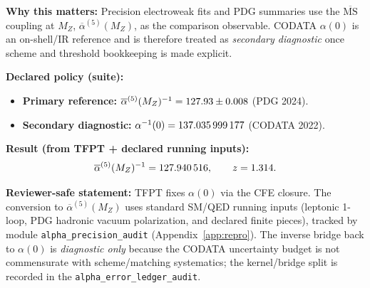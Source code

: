 \begin{tcolorbox}[colback=yellow!3, colframe=yellow!60!black,
    title={\textbf{Primary comparison observable: $\overline{\alpha}^{(5)}(M_Z)$ ($\overline{\mathrm{MS}}$)}}, fonttitle=\bfseries\small]
\textbf{Why this matters:} Precision electroweak fits and PDG summaries use the $\overline{\mathrm{MS}}$ coupling at $M_Z$, $\overline{\alpha}^{(5)}(M_Z)$, as the comparison observable. CODATA $\alpha(0)$ is an on-shell/IR reference and is therefore treated as \emph{secondary diagnostic} once scheme and threshold bookkeeping is made explicit.

\textbf{Declared policy (suite):}
\begin{itemize}[leftmargin=1.5em, topsep=2pt, itemsep=1pt]
    \item \textbf{Primary reference:} $\overline{\alpha}^{(5)}(M_Z)^{-1} = \num{\TFPTalphaBarFiveInvMZRefNum} \pm \num{\TFPTalphaBarFiveInvMZRefSigma}$ (PDG 2024).
    \item \textbf{Secondary diagnostic:} $\alpha^{-1}(0)=\num[round-mode=places,round-precision=9]{\TFPTalphaInvCODATANum}$ (CODATA 2022).
\end{itemize}

\textbf{Result (from TFPT + declared running inputs):}
\[
\overline{\alpha}^{(5)}(M_Z)^{-1}=\num[round-mode=places,round-precision=6]{\TFPTalphaBarFiveInvMZPredNum},
\qquad
z=\num[round-mode=places,round-precision=3]{\TFPTalphaBarFiveInvMZZ}.
\]

\textbf{Reviewer-safe statement:} TFPT fixes $\alpha(0)$ via the CFE closure. The conversion to $\overline{\alpha}^{(5)}(M_Z)$ uses standard SM/QED running inputs (leptonic 1-loop, PDG hadronic vacuum polarization, and declared finite pieces), tracked by module \texttt{alpha\_precision\_audit} (Appendix~\ref{app:repro}). The inverse bridge back to $\alpha(0)$ is \emph{diagnostic only} because the CODATA uncertainty budget is not commensurate with scheme/matching systematics; the kernel/bridge split is recorded in the \texttt{alpha\_error\_ledger\_audit}.
\end{tcolorbox}

